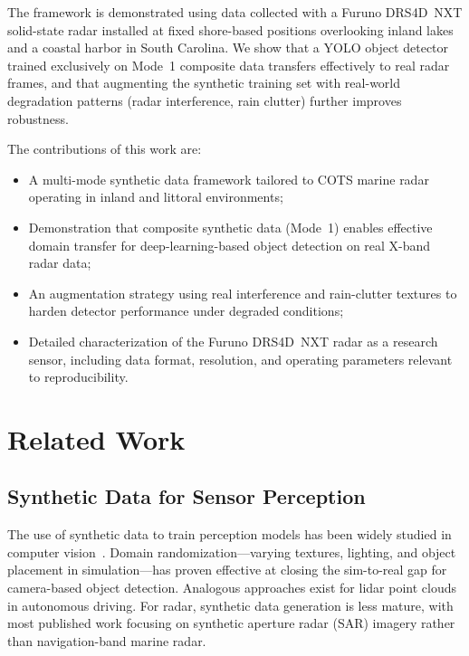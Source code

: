\documentclass[conf]{new-aiaa}
\begin{document}
The framework is demonstrated using data collected with a Furuno DRS4D~NXT solid-state radar installed at fixed shore-based positions overlooking inland lakes and a coastal harbor in South Carolina. We show that a YOLO object detector trained exclusively on Mode~1 composite data transfers effectively to real radar frames, and that augmenting the synthetic training set with real-world degradation patterns (radar interference, rain clutter) further improves robustness.

The contributions of this work are:
\begin{itemize}
    \item A multi-mode synthetic data framework tailored to COTS marine radar operating in inland and littoral environments;
    \item Demonstration that composite synthetic data (Mode~1) enables effective domain transfer for deep-learning-based object detection on real X-band radar data;
    \item An augmentation strategy using real interference and rain-clutter textures to harden detector performance under degraded conditions;
    \item Detailed characterization of the Furuno DRS4D~NXT radar as a research sensor, including data format, resolution, and operating parameters relevant to reproducibility.
\end{itemize}

\section{Related Work}
\label{sec:related}

\subsection{Synthetic Data for Sensor Perception}

The use of synthetic data to train perception models has been widely studied in computer vision~\cite{tobin2017domain, tremblay2018training, nikolenko2021synthetic}. Domain randomization---varying textures, lighting, and object placement in simulation---has proven effective at closing the sim-to-real gap for camera-based object detection. Analogous approaches exist for lidar point clouds in autonomous driving. For radar, synthetic data generation is less mature, with most published work focusing on synthetic aperture radar (SAR) imagery rather than navigation-band marine radar.
\end{document}
